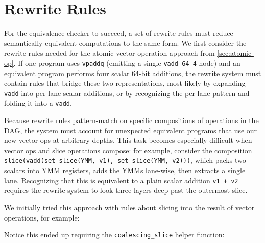 \section{Rewrite Rules}
\label{sec:rewriting}

For the equivalence checker to succeed, a set of rewrite rules must reduce semantically equivalent computations to the same form.
We first consider the rewrite rules needed for the atomic vector operation approach from \autoref{sec:atomic-op}.
If one program uses \texttt{vpaddq} (emitting a single \texttt{vadd 64 4} node) and an equivalent program performs four scalar 64-bit additions, the rewrite system must contain rules that bridge these two representations, most likely by expanding \texttt{vadd} into per-lane scalar additions, or by recognizing the per-lane pattern and folding it into a \texttt{vadd}.

Because rewrite rules pattern-match on specific compositions of operations in the DAG, the system must account for unexpected equivalent programs that use our new vector ops at arbitrary depths.
This task becomes especially difficult when vector ops and slice operations compose: for example, consider the composition \texttt{slice(vadd(set_slice(YMM, v1), set_slice(YMM, v2)))}, which packs two scalars into YMM registers, adds the YMMs lane-wise, then extracts a single lane.
Recognizing that this is equivalent to a plain scalar addition \texttt{v1 + v2} requires the rewrite system to look three layers deep past the outermost slice.

We initially tried this approach with rules about slicing into the result of vector operations, for example:


Notice this ended up requiring the \texttt{coalescing_slice} helper function:


